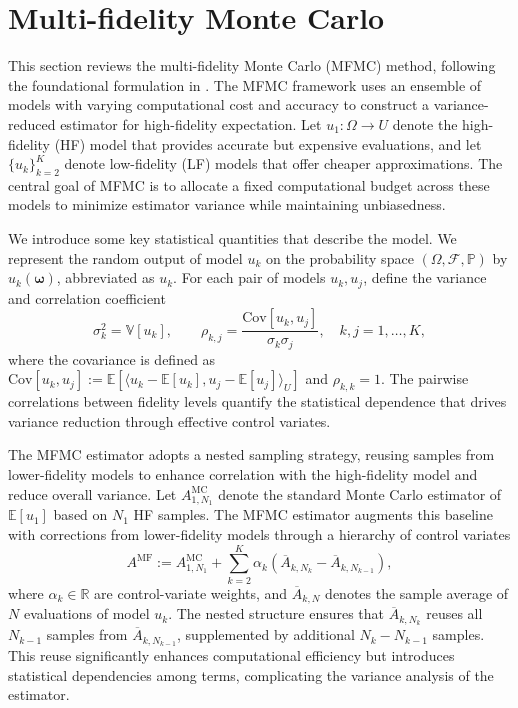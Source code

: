 \section{Multi-fidelity Monte Carlo}\label{sec:MFMC}
This section reviews the multi-fidelity Monte Carlo (MFMC) method, following the foundational formulation in \cite{PeWiGu:2016}. The MFMC framework uses an ensemble of models with varying computational cost and accuracy to construct a variance-reduced estimator for high-fidelity expectation. Let $u_1:\Omega \to U$ denote the high-fidelity (HF) model that provides accurate but expensive evaluations, and let $\{u_k\}_{k=2}^K$ denote low-fidelity (LF) models that offer cheaper approximations. The central goal of MFMC is to allocate a fixed computational budget across these models to minimize estimator variance while maintaining unbiasedness.

We introduce some key statistical quantities that describe the model. We represent the random output of model $u_k$ on the probability space $(\Omega,\mathcal{F},\mathbb{P})$ by $u_k(\boldsymbol{\omega})$, abbreviated as $u_k$. For each pair of models $u_k,u_j$, define the variance and correlation coefficient
%
\begin{equation*}
    \sigma_k^2 = \mathbb{V}\!\left[u_k\right],\qquad 
    \rho_{k,j} = \frac{\text{Cov}\!\left[u_k,u_j\right]}{\sigma_k\sigma_j}, 
    \quad k,j=1,\dots,K,
\end{equation*}
%
where the covariance is defined as $\text{Cov}[u_k,u_j] := \mathbb{E}[\langle u_k - \mathbb{E}[u_k], u_j - \mathbb{E}[u_j]\rangle_U]$ and $\rho_{k,k}=1$. The pairwise correlations between fidelity levels quantify the statistical dependence that drives variance reduction through effective control variates.

The MFMC estimator adopts a nested sampling strategy, reusing samples from lower-fidelity models to enhance correlation with the high-fidelity model and reduce overall variance. Let $A_{1,N_1}^{\text{MC}}$ denote the standard Monte Carlo estimator of $\mathbb{E}[u_1]$ based on $N_1$ HF samples. The MFMC estimator augments this baseline with corrections from lower-fidelity models through a hierarchy of control variates
%
\begin{equation}\label{eq:MFMC_estimator}
A^{\text{MF}} := A^{\text{MC}}_{1,N_1} + \sum_{k=2}^K \alpha_k\left(\overline{A}_{k,N_k} - \overline{A}_{k,N_{k-1}}\right),
\end{equation}
%
where $\alpha_k \in \mathbb{R}$ are control-variate weights, and $\overline{A}_{k,N}$ denotes the sample average of $N$ evaluations of model $u_k$. The nested structure ensures that $\overline{A}_{k,N_k}$ reuses all $N_{k-1}$ samples from $\overline{A}_{k,N_{k-1}}$, supplemented by additional $N_k - N_{k-1}$ samples. This reuse significantly enhances computational efficiency but introduces statistical dependencies among terms, complicating the variance analysis of the estimator.

